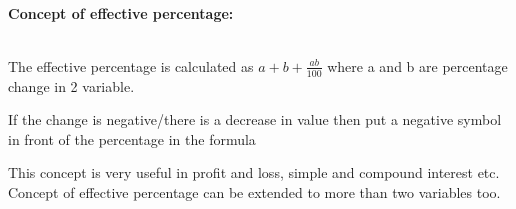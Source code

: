 \documentclass{article}
\begin{document}
\noindent \\ \textbf{Concept of effective percentage:}

\noindent \\ The  effective  percentage  is  calculated  as  $ a + b + \frac{ab}{100} $ where a and b are percentage change in 2 variable. 

\noindent If the change is negative/there is a decrease in value then put a negative symbol in front of the percentage in the formula

\noindent 

\noindent This  concept  is  very  useful  in  profit  and  loss,  simple  and  compound  interest  etc. Concept of effective percentage can be extended to more than two variables too.
\end{document}
